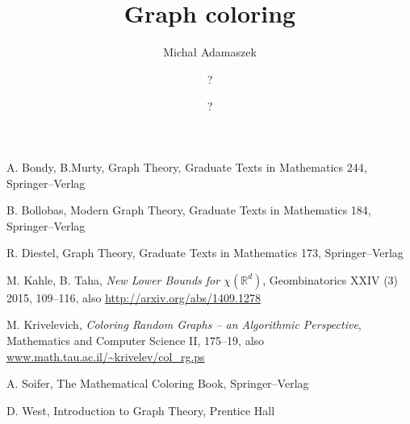 \documentclass[a4paper,oneside]{report}
\title{\bf Graph coloring}
\author{Micha{\l} Adamaszek \and ? \and ?}
\theoremstyle{plain}
\theoremstyle{myremark}
\newcommand{\real}{\mathbb{R}}
\begin{document}
\maketitle
\tableofcontents













\begin{thebibliography}{99}
 A. Bondy, B.Murty, Graph Theory, Graduate Texts in Mathematics 244, Springer--Verlag  

 B. Bollobas, Modern Graph Theory, Graduate Texts in Mathematics 184, Springer--Verlag

 R. Diestel, Graph Theory, Graduate Texts in Mathematics 173, Springer--Verlag  

 M. Kahle, B. Taha, \textit{New Lower Bounds for $\chi(\real^d)$}, Geombinatorics XXIV (3) 2015, 109--116, also \url{http://arxiv.org/abs/1409.1278}

 M. Krivelevich, \textit{Coloring Random Graphs -- an Algorithmic Perspective}, Mathematics and Computer Science II, 175--19, also \url{www.math.tau.ac.il/~krivelev/col_rg.ps}

 A. Soifer, The Mathematical Coloring Book, Springer--Verlag

 D. West, Introduction to Graph Theory, Prentice Hall

\end{thebibliography}
\end{document}
